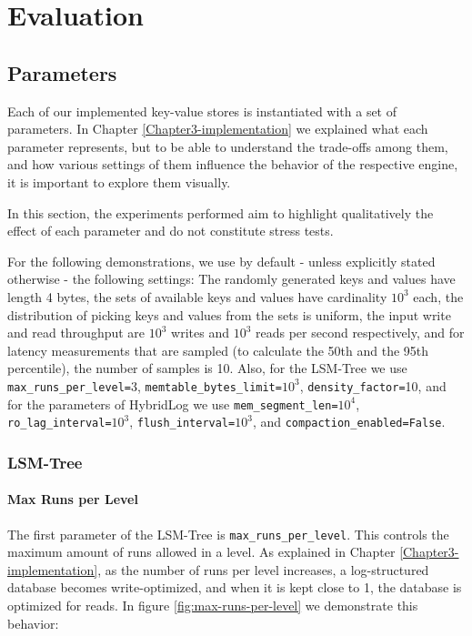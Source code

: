 
\chapter{Evaluation}

\label{Chapter4-evaluation}


\section{Parameters}

Each of our implemented key-value stores is instantiated with a set of parameters. In Chapter \ref{Chapter3-implementation} we explained what each parameter represents, but to be able to understand the trade-offs among them, and how various settings of them influence the behavior of the respective engine, it is important to explore them visually.

In this section, the experiments performed aim to highlight qualitatively the effect of each parameter and do not constitute stress tests.

For the following demonstrations, we use by default - unless explicitly stated otherwise - the following settings: The randomly generated keys and values have length 4 bytes, the sets of available keys and values have cardinality $10^3$ each, the distribution of picking keys and values from the sets is uniform, the input write and read throughput are $10^3$ writes and $10^3$ reads per second respectively, and for latency measurements that are sampled (to calculate the 50th and the 95th percentile), the number of samples is 10. Also, for the LSM-Tree we use \verb"max_runs_per_level="3, \verb"memtable_bytes_limit="$10^3$, \verb"density_factor="10, and for the parameters of HybridLog we use \verb"mem_segment_len="$10^4$, \verb"ro_lag_interval="$10^3$, \verb"flush_interval="$10^3$, and \verb"compaction_enabled=False".

\subsection{LSM-Tree}

\subsubsection{Max Runs per Level}

The first parameter of the LSM-Tree is \verb"max_runs_per_level". This controls the maximum amount of runs allowed in a level. As explained in Chapter \ref{Chapter3-implementation}, as the number of runs per level increases, a log-structured database becomes write-optimized, and when it is kept close to 1, the database is optimized for reads. In figure \ref{fig:max-runs-per-level} we demonstrate this behavior:

